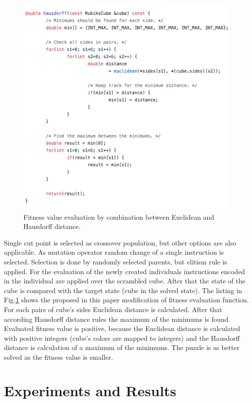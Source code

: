 \documentclass[runningheads]{llncs}
\begin{document}
\begin{figure}
\includegraphics[width=\textwidth]{fig01.png}
\caption{Fitness value evaluation by combination between Euclidean and Hausdorff distance.} \label{fig01}
\end{figure}
\FloatBarrier

Single cut point is selected as crossover population, but other options \cite{poli01} are also applicable. As mutation operator random change of a single instruction is selected. Selection is done by randomly selected parents, but elitism rule is applied. For the evaluation of the newly created individuals instructions encoded in the individual are applied over the scrambled cube. After that the state of the cube is compared with the target state (cube in the solved state). The listing in Fig.\ref{fig01} shows the proposed in this paper modification of fitness evaluation function. For each pairs of cube's sides Euclidean distance is calculated. After that according Hausdorff distance rules the maximum of the minimums is found. Evaluated fitness value is positive, because the Euclidean distance is calculated with positive integers (cube's colors are mapped to integers) and the Hausdorff distance is calculation of a maximum of the minimums. The puzzle is as better solved as the fitness value is smaller. 

\section{Experiments and Results}
\end{document}
